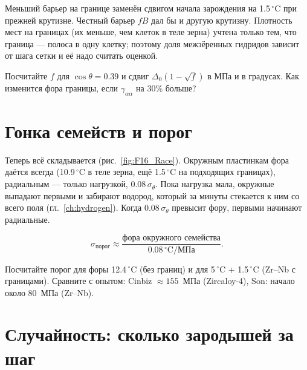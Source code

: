 \begin{warnbox}
Меньший барьер на границе заменён сдвигом начала зарождения на 1.5\,$^\circ$C при прежней крутизне.
Честный барьер $fB$ дал бы и другую крутизну. Плотность мест на границах (их меньше, чем клеток в
теле зерна) учтена только тем, что граница --- полоса в одну клетку; поэтому доля межзёренных
гидридов зависит от шага сетки и её надо считать оценкой.
\end{warnbox}

\begin{exercise}
Посчитайте $f$ для $\cos\theta=0.39$ и сдвиг $\Delta_0(1-\sqrt f)$ в МПа и в градусах.
Как изменится фора границы, если $\gamma_{\alpha\alpha}$ на 30\% больше?
\end{exercise}

\section{Гонка семейств и порог}

Теперь всё складывается (рис.~\ref{fig:F16_Race}). Окружным пластинкам фора даётся всегда
(10.9\,$^\circ$C в теле зерна, ещё 1.5\,$^\circ$C на подходящих границах), радиальным --- только
нагрузкой, $0.08\,\sigma_\theta$. Пока нагрузка мала, окружные выпадают первыми и забирают
водород, который за минуты стекается к ним со всего поля (гл.~\ref{ch:hydrogen}). Когда
$0.08\,\sigma_\theta$ превысит фору, первыми начинают радиальные.


\begin{keyf}[Порог]
\[
\sigma_{\text{порог}}\approx\frac{\text{фора окружного семейства}}{0.08\,^\circ\text{C/МПа}} .
\]
\end{keyf}

\begin{exercise}
Посчитайте порог для форы 12.4\,$^\circ$C (без границ) и для 5\,$^\circ$C + 1.5\,$^\circ$C (Zr--Nb
с границами). Сравните с опытом: Cinbiz $\approx155$~МПа (Zircaloy-4), Son: начало около 80~МПа (Zr--Nb).
\end{exercise}

\section{Случайность: сколько зародышей за шаг}

